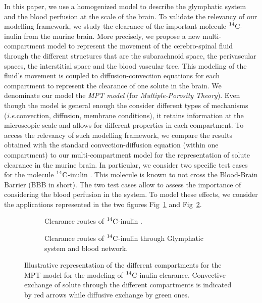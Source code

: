 \documentclass[10pt,letterpaper]{article}
\newcommand{\ie}{\emph{i.e.}\;}
\newcommand{\1}{^{(1)}}
\newcommand{\2}{^{(2)}}
\newcommand{\Cinulin}{$\prescript{14}{}{\text{C}}$-inulin }
\begin{document}
In this paper, we use a homogenized model to describe the glymphatic system and the blood perfusion at the scale of the brain. To validate the relevancy of our modelling framework, we study the clearance of the important molecule \Cinulin from the murine brain. 
More precisely, we propose a new multi-compartment model to represent the movement of the cerebro-spinal fluid through the different structures that are the subarachnoid space, the perivascular spaces, the interstitial space and the blood vascular tree. This modeling of the fluid's movement is coupled to diffusion-convection equations for each compartment to represent the clearance of one solute in the brain. 
We denominate our model the \textit{MPT model} (for \textit{Multiple-Porosity Theory}). 
Even though the model is general enough the consider different types of mechanisms (\ie convection, diffusion, membrane conditions), it retains information at the microscopic scale and allows for different properties in each compartment. %
To access the relevancy of such modelling framework, we compare the results obtained with the standard convection-diffusion equation (within one compartment) to our multi-compartment model for the representation of solute clearance in the murine brain. In particular, we consider two specific test cases for the molecule \Cinulin. This molecule is known to not cross the Blood-Brain Barrier (BBB in short). The two test cases allow to assess the importance of considering the blood perfusion in the system. To model these effects, we consider the applications represented in the two figures
Fig~\ref{fig:Cinulin-sketch} and Fig~\ref{fig:Cinulin-sketch7comps}.

\begin{figure}
\centering
\begin{subfigure}{.5\textwidth}
  \centering
  \caption{Clearance routes of \Cinulin.}
  \label{fig:Cinulin-sketch}
\end{subfigure}%
\begin{subfigure}{.5\textwidth}
  \centering
  \caption{Clearance routes of \Cinulin  through Glymphatic system and blood network.}
  \label{fig:Cinulin-sketch7comps}
\end{subfigure}
\caption{Illustrative representation of the different compartments for the MPT model for the modeling of \Cinulin clearance. Convective exchange of solute through the different compartments is indicated by red arrows while diffusive exchange by green ones.}
\label{fig:multi-comp}
\end{figure}
\end{document}
